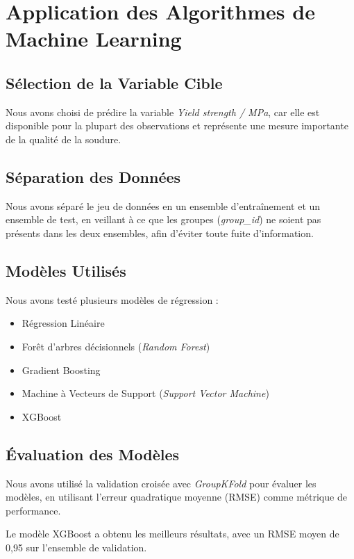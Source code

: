 \documentclass{article}
\begin{document}
\section{Application des Algorithmes de Machine Learning}

\subsection{Sélection de la Variable Cible}

Nous avons choisi de prédire la variable \textit{Yield strength / MPa}, car elle est disponible pour la plupart des observations et représente une mesure importante de la qualité de la soudure.

\subsection{Séparation des Données}

Nous avons séparé le jeu de données en un ensemble d'entraînement et un ensemble de test, en veillant à ce que les groupes (\textit{group\_id}) ne soient pas présents dans les deux ensembles, afin d'éviter toute fuite d'information.

\subsection{Modèles Utilisés}

Nous avons testé plusieurs modèles de régression :

\begin{itemize}
    \item Régression Linéaire
    \item Forêt d'arbres décisionnels (\textit{Random Forest})
    \item Gradient Boosting
    \item Machine à Vecteurs de Support (\textit{Support Vector Machine})
    \item XGBoost
\end{itemize}

\subsection{Évaluation des Modèles}

Nous avons utilisé la validation croisée avec \textit{GroupKFold} pour évaluer les modèles, en utilisant l'erreur quadratique moyenne (RMSE) comme métrique de performance.

Le modèle XGBoost a obtenu les meilleurs résultats, avec un RMSE moyen de 0,95 sur l'ensemble de validation.
\end{document}

